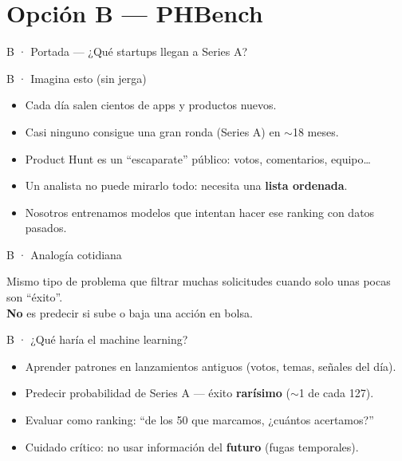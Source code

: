 \documentclass[aspectratio=169,10pt]{beamer}
\begin{document}
\section{Opción B --- PHBench}

\begin{frame}{B · Portada --- ¿Qué startups llegan a Series A?}
\end{frame}

\begin{frame}{B · Imagina esto (sin jerga)}
  \begin{itemize}
    \item Cada día salen cientos de apps y productos nuevos.
    \item Casi ninguno consigue una gran ronda (Series A) en $\sim$18 meses.
    \item Product Hunt es un ``escaparate'' público: votos, comentarios, equipo\ldots
    \item Un analista no puede mirarlo todo: necesita una \textbf{lista ordenada}.
    \item Nosotros entrenamos modelos que intentan hacer ese ranking con datos pasados.
  \end{itemize}
\end{frame}

\begin{frame}{B · Analogía cotidiana}
  \begin{center}
  \end{center}
  \vspace{0.45em}
  Mismo tipo de problema que filtrar muchas solicitudes cuando solo unas pocas son ``éxito''.\\
  \textbf{No} es predecir si sube o baja una acción en bolsa.
\end{frame}

\begin{frame}{B · ¿Qué haría el machine learning?}
  \begin{itemize}
    \item Aprender patrones en lanzamientos antiguos (votos, temas, señales del día).
    \item Predecir probabilidad de Series A --- éxito \textbf{rarísimo} ($\sim$1 de cada 127).
    \item Evaluar como ranking: ``de los 50 que marcamos, ¿cuántos acertamos?''
    \item Cuidado crítico: no usar información del \textbf{futuro} (fugas temporales).
  \end{itemize}
\end{frame}
\end{document}
